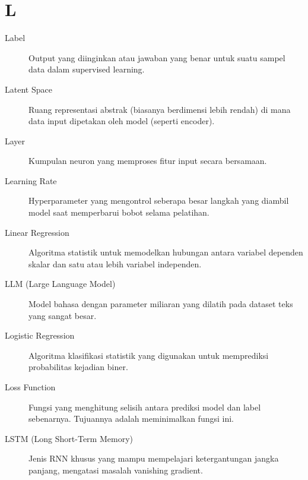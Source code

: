 \section*{L}
\begin{description}
    \item[Label] Output yang diinginkan atau jawaban yang benar untuk suatu sampel data dalam supervised learning.
    \item[Latent Space] Ruang representasi abstrak (biasanya berdimensi lebih rendah) di mana data input dipetakan oleh model (seperti encoder).
    \item[Layer] Kumpulan neuron yang memproses fitur input secara bersamaan.
    \item[Learning Rate] Hyperparameter yang mengontrol seberapa besar langkah yang diambil model saat memperbarui bobot selama pelatihan.
    \item[Linear Regression] Algoritma statistik untuk memodelkan hubungan antara variabel dependen skalar dan satu atau lebih variabel independen.
    \item[LLM (Large Language Model)] Model bahasa dengan parameter miliaran yang dilatih pada dataset teks yang sangat besar.
    \item[Logistic Regression] Algoritma klasifikasi statistik yang digunakan untuk memprediksi probabilitas kejadian biner.
    \item[Loss Function] Fungsi yang menghitung selisih antara prediksi model dan label sebenarnya. Tujuannya adalah meminimalkan fungsi ini.
    \item[LSTM (Long Short-Term Memory)] Jenis RNN khusus yang mampu mempelajari ketergantungan jangka panjang, mengatasi masalah vanishing gradient.
\end{description}


